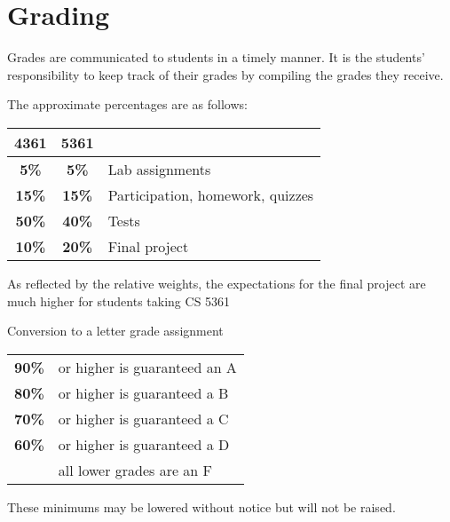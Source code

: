 \documentclass[12pt]{scrartcl}
\begin{document}
\section{Grading}

Grades are communicated to students in a timely manner. 
It is the students’ responsibility to keep track of their grades by compiling the grades they receive. 

The approximate percentages are as follows:
\begin{center}
\begin{tabular}{ccl}
\textbf{4361}	& \textbf{5361} \\
\hline  
\textbf{5\% } &			\textbf{5\% } &			 Lab assignments \\
\textbf{15\% } &			\textbf{15\% } &			 Participation, homework, quizzes \\
\textbf{50\% } &			\textbf{40\% } &			 Tests \\
\textbf{10\% } &			\textbf{20\% } &			 Final project \\

\end{tabular}
\end{center}
\begin{tcolorbox}[colback=blue!5,colframe=blue!75!black,title=Graduate vs. Undergraduate]
\begin{center}
As reflected by the relative weights, the expectations for the final project are much higher for students taking CS 5361
\end{center}
\end{tcolorbox}

 Conversion to a letter grade assignment 
\begin{center}
\begin{tabular}{rl}
\textbf{90\%}& or higher is guaranteed an A \\
\textbf{80\%}& or higher is guaranteed a B \\
\textbf{70\%}& or higher is guaranteed a C \\
\textbf{60\%}& or higher is guaranteed a D \\
\textbf{}& all lower grades are an F 
\end{tabular}
\end{center}
These minimums may be lowered without notice but will not be raised. 
\end{document}
